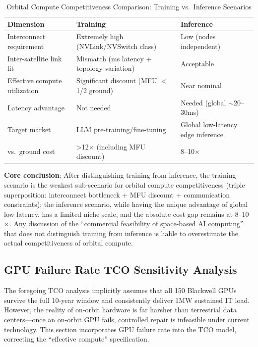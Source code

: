 \begin{table}[H]
\centering
\caption{Orbital Compute Competitiveness Comparison: Training vs.\ Inference Scenarios}
\label{tab:train_vs_infer}
\begin{tabular}{p{2.5cm}p{4.5cm}p{4.5cm}}
\toprule
\textbf{Dimension} & \textbf{Training} & \textbf{Inference} \\
\midrule
Interconnect requirement     & Extremely high (NVLink/NVSwitch class) & Low (nodes independent) \\
Inter-satellite link fit     & Mismatch (ms latency + topology variation) & Acceptable \\
Effective compute utilization & Significant discount (MFU $<$ 1/2 ground) & Near nominal \\
Latency advantage            & Not needed & Needed (global $\sim$20--30\;ms) \\
Target market                & LLM pre-training/fine-tuning & Global low-latency edge inference \\
vs.\ ground cost              & >12$\times$ (including MFU discount) & 8--10$\times$ \\
\bottomrule
\end{tabular}
\end{table}

\textbf{Core conclusion}: After distinguishing training from inference, the training scenario is the weakest sub-scenario for orbital compute competitiveness (triple superposition: interconnect bottleneck + MFU discount + communication constraints); the inference scenario, while having the unique advantage of global low latency, has a limited niche scale, and the absolute cost gap remains at 8--10$\times$. Any discussion of the ``commercial feasibility of space-based AI computing'' that does not distinguish training from inference is liable to overestimate the actual competitiveness of orbital compute.

\subsection{GPU Failure Rate TCO Sensitivity Analysis}

The foregoing TCO analysis implicitly assumes that all 150 Blackwell GPUs survive the full 10-year window and consistently deliver 1\;MW sustained IT load. However, the reality of on-orbit hardware is far harsher than terrestrial data centers---once an on-orbit GPU fails, controlled repair is infeasible under current technology. This section incorporates GPU failure rate into the TCO model, correcting the ``effective compute'' specification.

